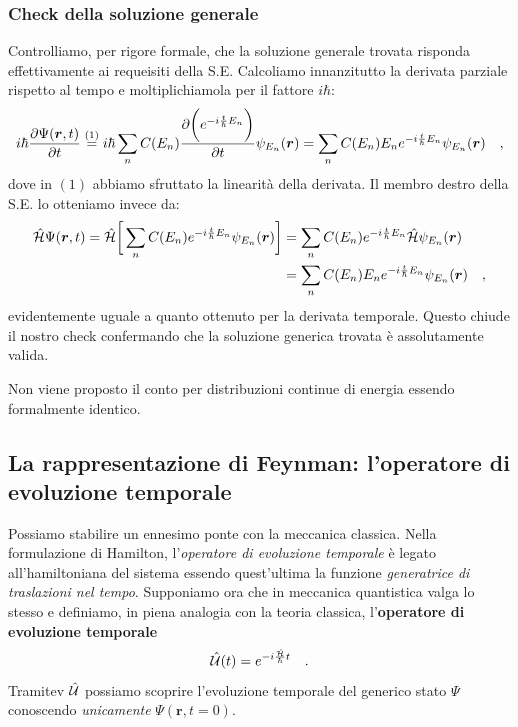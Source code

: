 \subsubsection{Check della soluzione generale}
Controlliamo, per rigore formale, che la soluzione generale trovata risponda effettivamente ai requeisiti della S.E. Calcoliamo innanzitutto la derivata parziale rispetto al tempo e moltiplichiamola per il fattore $i\hbar$:
\[
i\hbar\pdv{\Psi(\bm{r},t)}{t} \overset{(1)}{=} i\hbar\sum_n C(E_n) \pdv{\bigg(e^{-i\frac{t}{\hbar}E_n}\bigg)}{t} \psi_{E_n}(\bm{r}) = \sum_n C(E_n) E_n e^{-i\frac{t}{\hbar}E_n}\psi_{E_n}(\bm{r}) \quad,
\]
dove in $(1)$ abbiamo sfruttato la linearità della derivata. Il membro destro della S.E. lo otteniamo invece da:
\[
\begin{aligned}
    \hat{\mathcal{H}} \Psi(\bm{r},t) = \hat{\mathcal{H}}\bigg[ \sum_n C(E_n) {e^{-i\frac{t}{\hbar}E_n}} \psi_{E_n}(\bm{r}) \bigg] &= \sum_n C(E_n) {e^{-i\frac{t}{\hbar}E_n}} \hat{\mathcal{H}}\psi_{E_n}(\bm{r}) \\
    &=  \sum_n C(E_n)E_n {e^{-i\frac{t}{\hbar}E_n}} \psi_{E_n}(\bm{r}) \quad,
\end{aligned}
\]
evidentemente uguale a quanto ottenuto per la derivata temporale. Questo chiude il nostro check confermando che la soluzione generica trovata è assolutamente valida.

Non viene proposto il conto per distribuzioni continue di energia essendo formalmente identico.

\subsection{La rappresentazione di Feynman: l'operatore di evoluzione temporale}
Possiamo stabilire un ennesimo ponte con la meccanica classica. Nella formulazione di Hamilton, l'\emph{operatore di evoluzione temporale} è legato all'hamiltoniana del sistema essendo quest'ultima la funzione \emph{generatrice di traslazioni nel tempo}. Supponiamo ora che in meccanica quantistica valga lo stesso e definiamo, in piena analogia con la teoria classica, l'\textbf{operatore di evoluzione temporale}
\begin{equation}
    \hat{\mathcal{U}}(t) = e^{-i\frac{\hat{\mathcal{H}}}{\hbar}t} \quad.
\end{equation} 
Tramitev $\hat{\mathcal{U}}$ possiamo scoprire l'evoluzione temporale del generico stato $\Psi$ conoscendo \emph{unicamente} $\Psi(\bm{r}, t = 0)$. 

